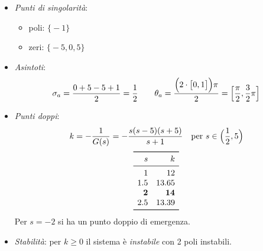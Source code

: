 \begin{esercizio}
\begin{itemize}
	\item \emph{Punti di singolarità}:
		\begin{itemize}
			\item poli: \(\bigl\{ -1 \bigr\}\)
			\item zeri: \(\bigl\{ -5,0,5 \bigr\}\)
		\end{itemize}
	\item \emph{Asintoti}:
		\[
			\sigma_a = \frac{0+5-5+1}{2} = \frac{1}{2} \qquad
			\theta_a = \frac{\Bigl(2\cdot \bigl[0,1\bigr]\Bigr)\pi}{2} = \Bigl[ \frac{\pi}{2},\frac{3}{2}\pi \Bigr]
		\]
	\item \emph{Punti doppi}:
		\[
			k = -\frac{1}{G(s)} = -\frac{s(s-5)(s+5)}{s+1} \quad
			\text{per } s \in \Bigl( \frac{1}{2},5 \Bigr)
		\]
		\[\begin{array}{rr}
			\toprule
			s 	&       k \\
			\midrule
			1 	&      12 \\
			1.5 	&   13.65 \\
			\bm{2} 	& \bm{14} \\
			2.5 	&   13.39 \\
			\bottomrule
		\end{array}\]
		Per \(s=-2\) si ha un punto doppio di emergenza.
	\item \emph{Stabilità}: per \(k \geq 0\) il sistema è \emph{instabile}
		con 2 poli instabili.
\end{itemize}
\end{esercizio}

